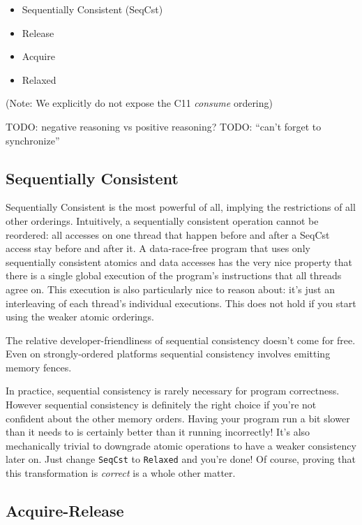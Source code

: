 \documentclass[a4paper,]{book}
\begin{document}
\begin{itemize}
\itemsep1pt\parskip0pt
\item
  Sequentially Consistent (SeqCst)
\item
  Release
\item
  Acquire
\item
  Relaxed
\end{itemize}

(Note: We explicitly do not expose the C11 \emph{consume} ordering)

TODO: negative reasoning vs positive reasoning? TODO: ``can't forget to
synchronize''

\subsection{Sequentially Consistent}\label{sequentially-consistent}

Sequentially Consistent is the most powerful of all, implying the
restrictions of all other orderings. Intuitively, a sequentially
consistent operation cannot be reordered: all accesses on one thread
that happen before and after a SeqCst access stay before and after it. A
data-race-free program that uses only sequentially consistent atomics
and data accesses has the very nice property that there is a single
global execution of the program's instructions that all threads agree
on. This execution is also particularly nice to reason about: it's just
an interleaving of each thread's individual executions. This does not
hold if you start using the weaker atomic orderings.

The relative developer-friendliness of sequential consistency doesn't
come for free. Even on strongly-ordered platforms sequential consistency
involves emitting memory fences.

In practice, sequential consistency is rarely necessary for program
correctness. However sequential consistency is definitely the right
choice if you're not confident about the other memory orders. Having
your program run a bit slower than it needs to is certainly better than
it running incorrectly! It's also mechanically trivial to downgrade
atomic operations to have a weaker consistency later on. Just change
\texttt{SeqCst} to \texttt{Relaxed} and you're done! Of course, proving
that this transformation is \emph{correct} is a whole other matter.

\subsection{Acquire-Release}\label{acquire-release}
\end{document}
